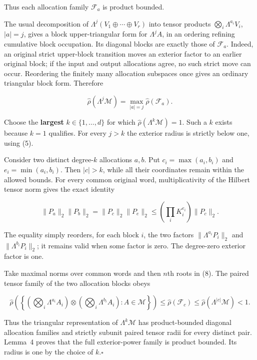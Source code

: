 \documentclass[11pt,a4paper]{article}
\begin{document}
Thus each allocation family \(\mathcal F_a\) is product bounded.

The usual decomposition of \(\Lambda^j(V_1\oplus\cdots\oplus V_r)\) into tensor products \(\bigotimes_i\Lambda^{a_i}V_i\), \(|a|=j\), gives a block upper-triangular form for \(\Lambda^j A\), in an ordering refining cumulative block occupation. Its diagonal blocks are exactly those of \(\mathcal F_a\). Indeed, an original strict upper-block transition moves an exterior factor to an earlier original block; if the input and output allocations agree, no such strict move can occur. Reordering the finitely many allocation subspaces once gives an ordinary triangular block form. Therefore

\[
\widehat\rho(\Lambda^j\mathcal M)
=\max_{|a|=j}\widehat\rho(\mathcal F_a).
\tag{7}
\]

Choose the \textbf{largest} \(k\in\{1,\ldots,d\}\) for which \(\widehat\rho(\Lambda^k\mathcal M)=1\). Such a \(k\) exists because \(k=1\) qualifies. For every \(j>k\) the exterior radius is strictly below one, using (5).

Consider two distinct degree-\(k\) allocations \(a,b\). Put \(c_i=\max(a_i,b_i)\) and \(e_i=\min(a_i,b_i)\). Then \(|c|>k\), while all their coordinates remain within the allowed bounds. For every common original word, multiplicativity of the Hilbert tensor norm gives the exact identity

\[
\|P_a\|_2\|P_b\|_2=\|P_c\|_2\|P_e\|_2
\le\left(\prod_iK_i^{e_i}\right)\|P_c\|_2.
\tag{8}
\]

The equality simply reorders, for each block \(i\), the two factors \(\|\Lambda^{a_i}P_i\|_2\) and \(\|\Lambda^{b_i}P_i\|_2\); it remains valid when some factor is zero. The degree-zero exterior factor is one.

Take maximal norms over common words and then \(n\)th roots in (8). The paired tensor family of the two allocation blocks obeys

\[
\widehat\rho\left(
\left\{\left(\bigotimes_i\Lambda^{a_i}A_i\right)
\otimes\left(\bigotimes_i\Lambda^{b_i}A_i\right):A\in\mathcal M\right\}
\right)
\le\widehat\rho(\mathcal F_c)
\le\widehat\rho(\Lambda^{|c|}\mathcal M)<1.
\tag{9}
\]

Thus the triangular representation of \(\Lambda^k\mathcal M\) has product-bounded diagonal allocation families and strictly subunit paired tensor radii for every distinct pair. Lemma~4 proves that the full exterior-power family is product bounded. Its radius is one by the choice of \(k\).\unskip\nobreak\hfill\(\square\)
\end{document}
